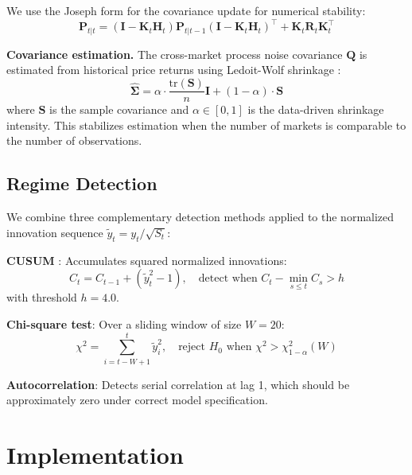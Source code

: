 \documentclass[11pt, a4paper]{article}
\begin{document}
We use the Joseph form for the covariance update for numerical stability:
\begin{equation}
    \mathbf{P}_{t|t} = (\mathbf{I} - \mathbf{K}_t \mathbf{H}_t) \mathbf{P}_{t|t-1} (\mathbf{I} - \mathbf{K}_t \mathbf{H}_t)^\top + \mathbf{K}_t \mathbf{R}_t \mathbf{K}_t^\top
\end{equation}

\textbf{Covariance estimation.} The cross-market process noise covariance $\mathbf{Q}$ is estimated from historical price returns using Ledoit-Wolf shrinkage \citep{ledoit2004}:
\begin{equation}
    \hat{\mathbf{\Sigma}} = \alpha \cdot \frac{\text{tr}(\mathbf{S})}{n} \mathbf{I} + (1 - \alpha) \cdot \mathbf{S}
\end{equation}
where $\mathbf{S}$ is the sample covariance and $\alpha \in [0,1]$ is the data-driven shrinkage intensity. This stabilizes estimation when the number of markets is comparable to the number of observations.

\subsection{Regime Detection}

We combine three complementary detection methods applied to the normalized innovation sequence $\tilde{y}_t = y_t / \sqrt{S_t}$:

\textbf{CUSUM} \citep{page1954}: Accumulates squared normalized innovations:
\begin{equation}
    C_t = C_{t-1} + (\tilde{y}_t^2 - 1), \quad \text{detect when } C_t - \min_{s \leq t} C_s > h
\end{equation}
with threshold $h = 4.0$.

\textbf{Chi-square test}: Over a sliding window of size $W = 20$:
\begin{equation}
    \chi^2 = \sum_{i=t-W+1}^{t} \tilde{y}_i^2, \quad \text{reject } H_0 \text{ when } \chi^2 > \chi^2_{1-\alpha}(W)
\end{equation}

\textbf{Autocorrelation}: Detects serial correlation at lag 1, which should be approximately zero under correct model specification.

\section{Implementation}
\end{document}
